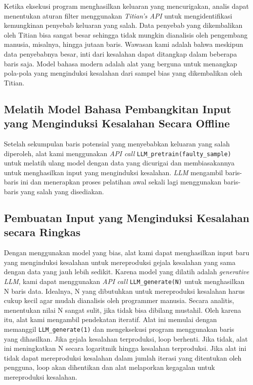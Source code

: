 Ketika eksekusi program menghasilkan keluaran yang 
mencurigakan, analis dapat menentukan aturan filter 
menggunakan \emph{Titian's API} untuk mengidentifikasi 
kemungkinan penyebab keluaran yang salah. Data penyebab 
yang dikembalikan oleh Titian bisa sangat besar sehingga 
tidak mungkin dianalisis oleh pengembang manusia, misalnya, 
hingga jutaan baris. Wawasan kami adalah bahwa meskipun data 
penyebabnya besar, inti dari kesalahan dapat ditangkap dalam 
beberapa baris saja. Model bahasa modern adalah alat yang 
berguna untuk menangkap pola-pola yang menginduksi kesalahan 
dari sampel bias yang dikembalikan oleh Titian.

\subsection{Melatih Model Bahasa Pembangkitan Input yang Menginduksi Kesalahan Secara Offline}
\label{sec:melatih model}

Setelah sekumpulan baris potensial yang menyebabkan keluaran 
yang salah diperoleh, alat kami menggunakan \emph{API call} 
{\tt LLM\_pretrain(faulty\_sample)} untuk melatih ulang model 
dengan data yang dicurigai dan membiasakannya untuk 
menghasilkan input yang menginduksi kesalahan. \emph{LLM} 
mengambil baris-baris ini dan menerapkan proses pelatihan 
awal sekali lagi menggunakan baris-baris yang salah yang 
disediakan.

\subsection{Pembuatan Input yang Menginduksi Kesalahan secara Ringkas}
\label{sec:pembuatan input}

Dengan menggunakan model yang bias, alat kami dapat 
menghasilkan input baru yang menginduksi kesalahan untuk 
mereproduksi gejala kesalahan yang sama dengan data yang 
jauh lebih sedikit. Karena model yang dilatih adalah 
\emph{generative LLM}, kami dapat menggunakan 
\emph{API call} {\tt LLM\_generate(N)} untuk menghasilkan 
N baris data. Idealnya, N yang dibutuhkan untuk mereproduksi 
kesalahan harus cukup kecil agar mudah dianalisis oleh 
programmer manusia. Secara analitis, menentukan nilai N 
sangat sulit, jika tidak bisa dibilang mustahil. Oleh 
karena itu, alat kami mengambil pendekatan iteratif. 
Alat ini memulai dengan memanggil {\tt LLM\_generate(1)} 
dan mengeksekusi program menggunakan baris yang dihasilkan. 
Jika gejala kesalahan terproduksi, loop berhenti. Jika tidak, 
alat ini meningkatkan N secara logaritmik hingga kesalahan 
terproduksi. Jika alat ini tidak dapat mereproduksi kesalahan 
dalam jumlah iterasi yang ditentukan oleh pengguna, loop akan 
dihentikan dan alat melaporkan kegagalan untuk mereproduksi 
kesalahan.

